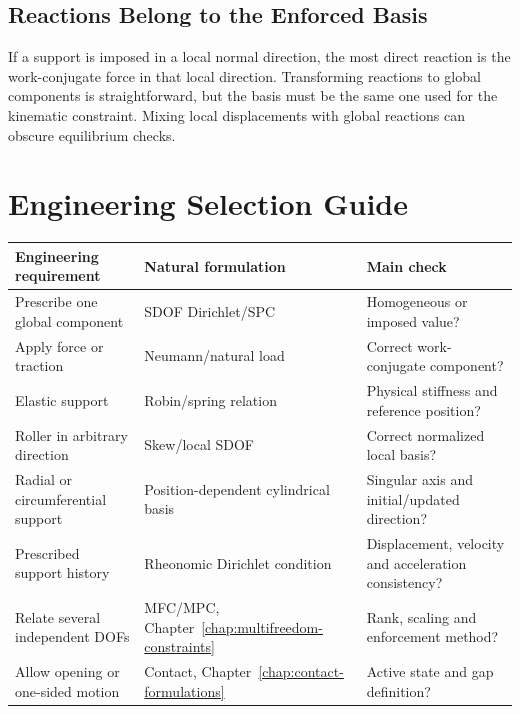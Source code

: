 \subsection{Reactions Belong to the Enforced Basis}

If a support is imposed in a local normal direction, the most direct reaction
is the work-conjugate force in that local direction. Transforming reactions to
global components is straightforward, but the basis must be the same one used
for the kinematic constraint. Mixing local displacements with global reactions
can obscure equilibrium checks.

\section{Engineering Selection Guide}

\begin{center}
\small
\renewcommand{\arraystretch}{1.08}
\begin{tabular}{>{\raggedright\arraybackslash}p{} >{\raggedright\arraybackslash}p{} >{\raggedright\arraybackslash}p{}}
\hline
\textbf{Engineering requirement} & \textbf{Natural formulation} & \textbf{Main check}\\
\hline
Prescribe one global component & SDOF Dirichlet/SPC & Homogeneous or imposed value?\\
Apply force or traction & Neumann/natural load & Correct work-conjugate component?\\
Elastic support & Robin/spring relation & Physical stiffness and reference position?\\
Roller in arbitrary direction & Skew/local SDOF & Correct normalized local basis?\\
Radial or circumferential support & Position-dependent cylindrical basis & Singular axis and initial/updated direction?\\
Prescribed support history & Rheonomic Dirichlet condition & Displacement, velocity and acceleration consistency?\\
Relate several independent DOFs & MFC/MPC, Chapter~\ref{chap:multifreedom-constraints} & Rank, scaling and enforcement method?\\
Allow opening or one-sided motion & Contact, Chapter~\ref{chap:contact-formulations} & Active state and gap definition?\\
\hline
\end{tabular}
\end{center}


